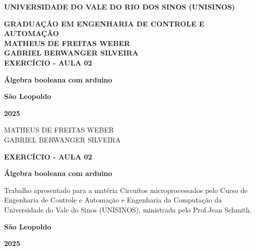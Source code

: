 \documentclass[12pt, a4paper]{article}
\date{\today}
\newcommand\studentName{Matheus de Freitas Weber}
\newcommand\studentTwoName{Gabriel Berwanger Silveira}
\newcommand\courseName{Circuitos microprocessados}
\newcommand\titleName{Exercício - Aula 02}
\newcommand\subTitleName{Álgebra booleana com arduino}
\newcommand\teacherName{Jean Schmith}
\begin{document}
\begin{center}
	\MakeUppercase{\textbf{Universidade do Vale do Rio dos Sinos (Unisinos)}}

	\MakeUppercase{\textbf{Graduação em Engenharia de controle e automação}} \\[16ex]


	\MakeUppercase{\textbf{\studentName}}
	\\
	\MakeUppercase{\textbf{\studentTwoName}}
	\\[16ex]

	\MakeUppercase{\textbf{\titleName}}

	\textbf{\subTitleName}

	\vfill

	\textbf{São Leopoldo}

	\textbf{2025}

	\thispagestyle{empty}
\end{center}
\newpage

\begin{center}
	\vspace*{28ex}
	\MakeUppercase{\studentName}
	\\
	\MakeUppercase{\studentTwoName}
	\vspace*{16ex}

	\MakeUppercase{\textbf{\titleName}}

	\textbf{\subTitleName}

	\vspace*{8ex}

	\hfill\begin{minipage}{0.5\linewidth}
		Trabalho apresentado para a matéria {\courseName} pelo Curso de Engenharia de Controle e Automação e Engenharia da Computação da Universidade do Vale do Sinos (UNISINOS), ministrada pelo Prof.\teacherName.
	\end{minipage}
	\vfill

	\textbf{São Leopoldo}

	\textbf{2025}

\end{center}
\thispagestyle{empty}
\setcounter{page}{1}
\newpage

\begin{center}
	\tableofcontents
\end{center}
\thispagestyle{empty}
\newpage

\end{document}
